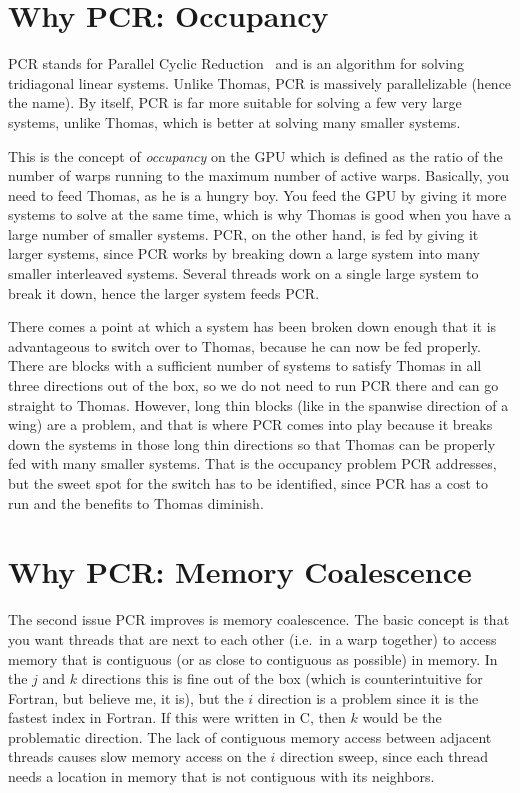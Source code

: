 \documentclass[noinfobox]{mdolab-article}
\begin{document}
\section{Why PCR: Occupancy}

PCR stands for Parallel Cyclic Reduction~\citep{Hockney1981} and is an algorithm for solving tridiagonal linear systems.
Unlike Thomas, PCR is massively parallelizable (hence the name).
By itself, PCR is far more suitable for solving a few very large systems, unlike Thomas, which is better at solving many smaller systems.

This is the concept of \emph{occupancy} on the GPU which is defined as the ratio of the number of warps running to the maximum number of active warps.
Basically, you need to feed Thomas, as he is a hungry boy.
You feed the GPU by giving it more systems to solve at the same time, which is why Thomas is good when you have a large number of smaller systems.
PCR, on the other hand, is fed by giving it larger systems, since PCR works by breaking down a large system into many smaller interleaved systems.
Several threads work on a single large system to break it down, hence the larger system feeds PCR.

There comes a point at which a system has been broken down enough that it is advantageous to switch over to Thomas, because he can now be fed properly.
There are blocks with a sufficient number of systems to satisfy Thomas in all three directions out of the box, so we do not need to run PCR there and can go straight to Thomas.
However, long thin blocks (like in the spanwise direction of a wing) are a problem, and that is where PCR comes into play because it breaks down the systems in those long thin directions so that Thomas can be properly fed with many smaller systems.
That is the occupancy problem PCR addresses, but the sweet spot for the switch has to be identified, since PCR has a cost to run and the benefits to Thomas diminish.

\section{Why PCR: Memory Coalescence}

The second issue PCR improves is memory coalescence.
The basic concept is that you want threads that are next to each other (i.e.\ in a warp together) to access memory that is contiguous (or as close to contiguous as possible) in memory.
In the $j$ and $k$ directions this is fine out of the box (which is counterintuitive for Fortran, but believe me, it is), but the $i$ direction is a problem since it is the fastest index in Fortran.
If this were written in C, then $k$ would be the problematic direction.
The lack of contiguous memory access between adjacent threads causes slow memory access on the $i$ direction sweep, since each thread needs a location in memory that is not contiguous with its neighbors.
\end{document}
